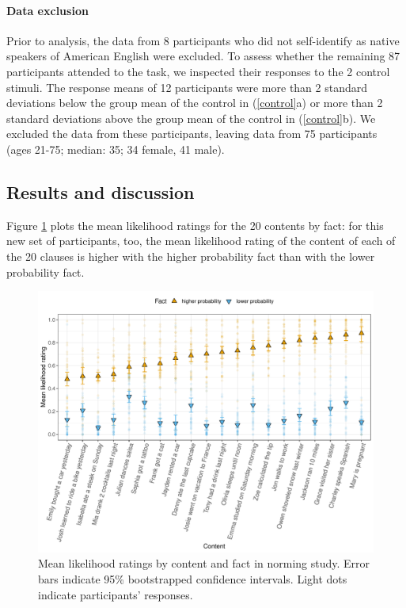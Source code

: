 \documentclass[11pt,fleqn]{article}
\newcommand{\6}{\mbox{$[\hspace*{-.6mm}[$}}
\newcommand{\9}{\mbox{$]\hspace*{-.6mm}]$}}
\begin{document}
\paragraph{Data exclusion} Prior to analysis, the data from 8 participants who did not self-identify as native speakers of American English were excluded. To assess whether the remaining 87 participants attended to the task, we inspected their responses to the 2 control stimuli. The response means of 12 participants were more than 2 standard deviations below the group mean of the control in (\ref{control}a) or more than 2 standard deviations above the group mean of the control in (\ref{control}b). We excluded the data from these participants, leaving data from 75 participants (ages 21-75; median: 35; 34 female, 41 male).

\subsection{Results and discussion}

Figure \ref{f-prior} plots the mean likelihood ratings for the 20 contents by fact: for this new set of participants, too, the mean likelihood rating of the content of each of the 20 clauses is higher with the higher probability fact than with the lower probability fact. 

\begin{figure}[H]
\centering

\includegraphics[width=.75\paperwidth]{../../results/1-prior/graphs/ratings-for-CCs-identified-by-clause}

\caption{Mean likelihood ratings by content and fact in norming study. Error bars indicate 95\% bootstrapped confidence intervals. Light dots indicate participants' responses.}
\label{f-prior}
\end{figure}
\end{document}
